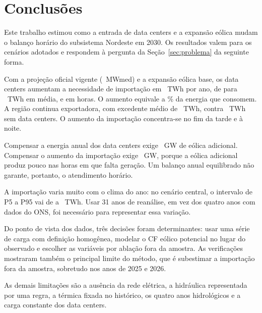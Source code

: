 \section{Conclusões}
\label{sec:conclusoes}

Este trabalho estimou como a entrada de data centers e a expansão eólica mudam o balanço horário do subsistema Nordeste em 2030. Os resultados valem para os cenários adotados e respondem à pergunta da Seção~\ref{sec:problema} da seguinte forma.

Com a projeção oficial vigente (\DcRqDois~MWmed) e a expansão eólica base, os data centers aumentam a necessidade de importação em \EfCen~TWh por ano, de \ImpSem{} para \ImpCen~TWh em média, e em \EfHoras{} horas. O aumento equivale a \EfPct\% da energia que consomem. A região continua exportadora, com excedente médio de \ExcCen~TWh, contra \ExcSem~TWh sem data centers. O aumento da importação concentra-se no fim da tarde e à noite.

Compensar a energia anual dos data centers exige \CompEnergia~GW de eólica adicional. Compensar o aumento da importação exige \CompImp~GW, porque a eólica adicional produz pouco nas horas em que falta geração. Um balanço anual equilibrado não garante, portanto, o atendimento horário.

A importação varia muito com o clima do ano: no cenário central, o intervalo de P5 a P95 vai de \ImpCenPCinco{} a \ImpCenPNoventa~TWh. Usar 31 anos de reanálise, em vez dos quatro anos com dados do ONS, foi necessário para representar essa variação.

Do ponto de vista dos dados, três decisões foram determinantes: usar uma série de carga com definição homogênea, modelar o CF eólico potencial no lugar do observado e escolher as variáveis por ablação fora da amostra. As verificações mostraram também o principal limite do método, que é subestimar a importação fora da amostra, sobretudo nos anos de 2025 e 2026.

As demais limitações são a ausência da rede elétrica, a hidráulica representada por uma regra, a térmica fixada no histórico, os quatro anos hidrológicos e a carga constante dos data centers.
